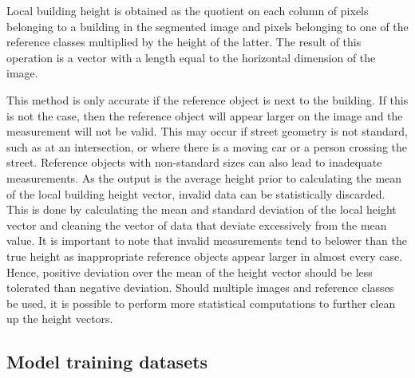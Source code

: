 \documentclass[journal,article,submit,pdftex,moreauthors]{Definitions/mdpi}
\begin{document}
Local building height is obtained as the quotient on each column of pixels belonging to a building in the segmented image and pixels belonging to one of the reference classes multiplied by the height of the latter. The result of this operation is a vector with a length equal to the horizontal dimension of the image. 

This method is only accurate if the reference object is next to the building. If this is not the case, then the reference object will appear larger on the image and the measurement will not be valid. This may occur if street geometry is not standard, such as at an intersection, or where there is a moving car or a person crossing the street. Reference objects with non-standard sizes can also lead to inadequate measurements. As the output is the average height prior to calculating the mean of the local building height vector, invalid data can be statistically discarded. This is done by calculating the mean and standard deviation of the local height vector and cleaning the vector of data that deviate excessively from the mean value. It is important to note that invalid measurements tend to belower than the true height as inappropriate reference objects appear larger in almost every case. Hence, positive deviation over the mean of the height vector should be less tolerated than negative deviation. Should multiple images and reference classes be used, it is possible to perform more statistical computations to further clean up the height vectors.

\subsection{Model training datasets}
\end{document}
